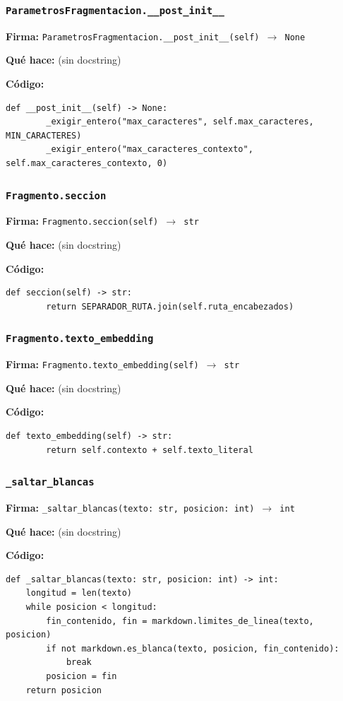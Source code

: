 \documentclass[11pt,a4paper]{article}
\begin{document}
\subsubsection*{\texttt{ParametrosFragmentacion.\_\_post\_init\_\_}}
\textbf{Firma:} \texttt{ParametrosFragmentacion.\_\_post\_init\_\_(self) $\rightarrow$ None}

\textbf{Qué hace:} (sin docstring)

\textbf{Código:}
\begin{lstlisting}
def __post_init__(self) -> None:
        _exigir_entero("max_caracteres", self.max_caracteres, MIN_CARACTERES)
        _exigir_entero("max_caracteres_contexto", self.max_caracteres_contexto, 0)
\end{lstlisting}

\subsubsection*{\texttt{Fragmento.seccion}}
\textbf{Firma:} \texttt{Fragmento.seccion(self) $\rightarrow$ str}

\textbf{Qué hace:} (sin docstring)

\textbf{Código:}
\begin{lstlisting}
def seccion(self) -> str:
        return SEPARADOR_RUTA.join(self.ruta_encabezados)
\end{lstlisting}

\subsubsection*{\texttt{Fragmento.texto\_embedding}}
\textbf{Firma:} \texttt{Fragmento.texto\_embedding(self) $\rightarrow$ str}

\textbf{Qué hace:} (sin docstring)

\textbf{Código:}
\begin{lstlisting}
def texto_embedding(self) -> str:
        return self.contexto + self.texto_literal
\end{lstlisting}

\subsubsection*{\texttt{\_saltar\_blancas}}
\textbf{Firma:} \texttt{\_saltar\_blancas(texto: str, posicion: int) $\rightarrow$ int}

\textbf{Qué hace:} (sin docstring)

\textbf{Código:}
\begin{lstlisting}
def _saltar_blancas(texto: str, posicion: int) -> int:
    longitud = len(texto)
    while posicion < longitud:
        fin_contenido, fin = markdown.limites_de_linea(texto, posicion)
        if not markdown.es_blanca(texto, posicion, fin_contenido):
            break
        posicion = fin
    return posicion
\end{lstlisting}
\end{document}

